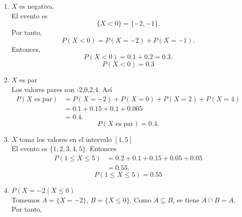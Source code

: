 \documentclass[12pt,a4paper]{article}
\begin{document}
    \begin{solucion}
        \begin{enumerate}
            \item[(a)] $X$ es negativa.\\
            El evento es
            \begin{equation*}
                \{X\lt0\}=\{-2,-1\}.
            \end{equation*}
            Por tanto,
            \begin{equation*}
                P(X\lt0)=P(X=-2)+P(X=-1).
            \end{equation*}
            Entonces,
            \begin{equation*}
                P(X\lt0)=0.1+0.2=0.3.
            \end{equation*}
            \begin{equation*}
                P(X\lt0)=0.3
            \end{equation*}
            \item[(b)] $X$ es par\\
            Los valores pares son -2,0,2,4. Así
            \begin{align*}
                P(X\text{ es par})&=P(X=-2)+P(X=0)+P(X=2)+P(X=4)\\
                &=0.1+0.15+0.1+0.005\\
                &=0.4.
            \end{align*}
            \begin{equation*}
                P(X\text{ es par})=0.4.
            \end{equation*}
            \item[(c)] $X$ toma los valores en el intervalo $[1,5]$\\
            El evento es $\{1,2,3,4,5\}$. Entonces
            \begin{align*}
                P(1\leq X\leq 5)&=0.2+0.1+0.15+0.05+0.05\\
                &=0.55.
            \end{align*}
            \begin{equation*}
                P(1\leq X\leq 5)=0.55
            \end{equation*}
            \item[(d)] $P(X=-2\mid X\leq0)$\\
            Tomemos $A=\{X=-2\}$, $B=\{X\leq0\}$. Como $A\subseteq B$, se tiene $A\cap B=A$. Por tanto,
            \begin{equation*}

\end{equation*}
\end{enumerate}
\end{solucion}
\end{document}

